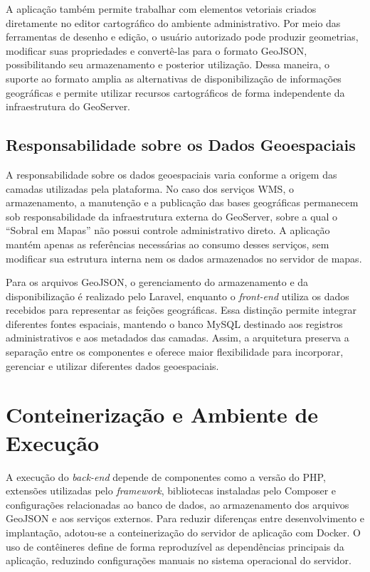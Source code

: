 A aplicação também permite trabalhar com elementos vetoriais criados diretamente no editor cartográfico do ambiente administrativo. Por meio das ferramentas de desenho e edição, o usuário autorizado pode produzir geometrias, modificar suas propriedades e convertê-las para o formato GeoJSON, possibilitando seu armazenamento e posterior utilização. Dessa maneira, o suporte ao formato amplia as alternativas de disponibilização de informações geográficas e permite utilizar recursos cartográficos de forma independente da infraestrutura do GeoServer.

\subsection{Responsabilidade sobre os Dados Geoespaciais}
\label{sec:responsabilidade-dados-geoespaciais}

A responsabilidade sobre os dados geoespaciais varia conforme a origem das camadas utilizadas pela plataforma. No caso dos serviços WMS, o armazenamento, a manutenção e a publicação das bases geográficas permanecem sob responsabilidade da infraestrutura externa do GeoServer, sobre a qual o ``Sobral em Mapas'' não possui controle administrativo direto. A aplicação mantém apenas as referências necessárias ao consumo desses serviços, sem modificar sua estrutura interna nem os dados armazenados no servidor de mapas.

Para os arquivos GeoJSON, o gerenciamento do armazenamento e da disponibilização é realizado pelo Laravel, enquanto o \textit{front-end} utiliza os dados recebidos para representar as feições geográficas. Essa distinção permite integrar diferentes fontes espaciais, mantendo o banco MySQL destinado aos registros administrativos e aos metadados das camadas. Assim, a arquitetura preserva a separação entre os componentes e oferece maior flexibilidade para incorporar, gerenciar e utilizar diferentes dados geoespaciais.

\section{Conteinerização e Ambiente de Execução}
\label{sec:conteinerizacao-ambiente}

A execução do \textit{back-end} depende de componentes como a versão do PHP, extensões utilizadas pelo \textit{framework}, bibliotecas instaladas pelo Composer e configurações relacionadas ao banco de dados, ao armazenamento dos arquivos GeoJSON e aos serviços externos. Para reduzir diferenças entre desenvolvimento e implantação, adotou-se a conteinerização do servidor de aplicação com Docker. O uso de contêineres define de forma reproduzível as dependências principais da aplicação, reduzindo configurações manuais no sistema operacional do servidor.

